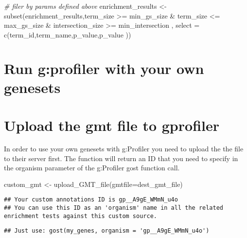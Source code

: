 \documentclass[
]{book}
\newenvironment{Shaded}{\begin{snugshade}}{\end{snugshade}}
\newcommand{\AttributeTok}[1]{\textcolor[rgb]{0.77,0.63,0.00}{#1}}
\newcommand{\CommentTok}[1]{\textcolor[rgb]{0.56,0.35,0.01}{\textit{#1}}}
\newcommand{\FunctionTok}[1]{\textcolor[rgb]{0.00,0.00,0.00}{#1}}
\newcommand{\NormalTok}[1]{#1}
\newcommand{\OtherTok}[1]{\textcolor[rgb]{0.56,0.35,0.01}{#1}}
\newcommand{\SpecialCharTok}[1]{\textcolor[rgb]{0.00,0.00,0.00}{#1}}
\begin{document}
\begin{Shaded}
\begin{Highlighting}[]
\CommentTok{\# filer by params defined above}
\NormalTok{enrichment\_results }\OtherTok{\textless{}{-}} \FunctionTok{subset}\NormalTok{(enrichment\_results,term\_size }\SpecialCharTok{\textgreater{}=}\NormalTok{ min\_gs\_size }\SpecialCharTok{\&} 
\NormalTok{                                   term\_size }\SpecialCharTok{\textless{}=}\NormalTok{ max\_gs\_size }\SpecialCharTok{\&} 
\NormalTok{                                   intersection\_size }\SpecialCharTok{\textgreater{}=}\NormalTok{ min\_intersection , }
                                 \AttributeTok{select =} \FunctionTok{c}\NormalTok{(term\_id,term\_name,p\_value,p\_value ))}
\end{Highlighting}
\end{Shaded}

\hypertarget{run-gprofiler-with-your-own-genesets}{%
\section{Run g:profiler with your own genesets}\label{run-gprofiler-with-your-own-genesets}}

\hypertarget{upload-the-gmt-file-to-gprofiler}{%
\section{Upload the gmt file to gprofiler}\label{upload-the-gmt-file-to-gprofiler}}

In order to use your own genesets with g:Profiler you need to upload the the file to their server first. The function will return an ID that you need to specify in the organism parameter of the g:Profiler gost function call.

\begin{Shaded}
\begin{Highlighting}[]
\NormalTok{custom\_gmt }\OtherTok{\textless{}{-}} \FunctionTok{upload\_GMT\_file}\NormalTok{(}\AttributeTok{gmtfile=}\NormalTok{dest\_gmt\_file)}
\end{Highlighting}
\end{Shaded}

\begin{verbatim}
## Your custom annotations ID is gp__A9gE_WMmN_u4o
## You can use this ID as an 'organism' name in all the related enrichment tests against this custom source.
\end{verbatim}

\begin{verbatim}
## Just use: gost(my_genes, organism = 'gp__A9gE_WMmN_u4o')
\end{verbatim}
\end{document}
